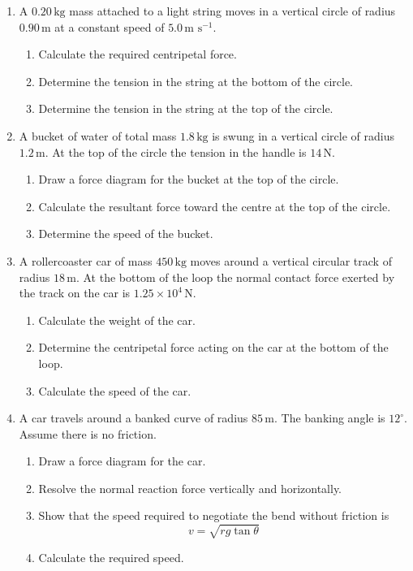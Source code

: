 \documentclass[12pt]{article}
\begin{document}
\begin{enumerate}[label=\textbf{\arabic*.}, itemsep=2em]
\item
A \(0.20\,\text{kg}\) mass attached to a light string moves in a vertical circle of radius \(0.90\,\text{m}\) at a constant speed of \(5.0\,\text{m s}^{-1}\).

\begin{enumerate}[label=(\alph*)]
    \item Calculate the required centripetal force.
    \item Determine the tension in the string at the bottom of the circle.
    \item Determine the tension in the string at the top of the circle.
\end{enumerate}

\item
A bucket of water of total mass \(1.8\,\text{kg}\) is swung in a vertical circle of radius \(1.2\,\text{m}\). At the top of the circle the tension in the handle is \(14\,\text{N}\).

\begin{enumerate}[label=(\alph*)]
    \item Draw a force diagram for the bucket at the top of the circle.
    \item Calculate the resultant force toward the centre at the top of the circle.
    \item Determine the speed of the bucket.
\end{enumerate}

\newpage
\item
A rollercoaster car of mass \(450\,\text{kg}\) moves around a vertical circular track of radius \(18\,\text{m}\). At the bottom of the loop the normal contact force exerted by the track on the car is \(1.25\times10^4\,\text{N}\).

\begin{enumerate}[label=(\alph*)]
    \item Calculate the weight of the car.
    \item Determine the centripetal force acting on the car at the bottom of the loop.
    \item Calculate the speed of the car.
\end{enumerate}

\item
A car travels around a banked curve of radius \(85\,\text{m}\). The banking angle is \(12^\circ\). Assume there is no friction.

\begin{enumerate}[label=(\alph*)]
    \item Draw a force diagram for the car.
    \item Resolve the normal reaction force vertically and horizontally.
    \item Show that the speed required to negotiate the bend without friction is
    \[
    v = \sqrt{rg\tan\theta}
    \]
    \item Calculate the required speed.
\end{enumerate}


\end{enumerate}
\end{document}
